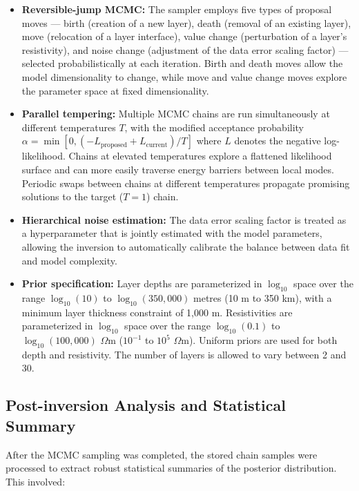 \begin{itemize}
    \item \textbf{Reversible-jump MCMC:} The sampler employs five types of proposal moves --- birth (creation of a new layer), death (removal of an existing layer), move (relocation of a layer interface), value change (perturbation of a layer's resistivity), and noise change (adjustment of the data error scaling factor) --- selected probabilistically at each iteration. Birth and death moves allow the model dimensionality to change, while move and value change moves explore the parameter space at fixed dimensionality.

    \item \textbf{Parallel tempering:} Multiple MCMC chains are run simultaneously at different temperatures $T$, with the modified acceptance probability $\alpha = \min\left[0, (-L_{\text{proposed}} + L_{\text{current}})/T\right]$ where $L$ denotes the negative log-likelihood. Chains at elevated temperatures explore a flattened likelihood surface and can more easily traverse energy barriers between local modes. Periodic swaps between chains at different temperatures propagate promising solutions to the target ($T = 1$) chain.

    \item \textbf{Hierarchical noise estimation:} The data error scaling factor is treated as a hyperparameter that is jointly estimated with the model parameters, allowing the inversion to automatically calibrate the balance between data fit and model complexity.

    \item \textbf{Prior specification:} Layer depths are parameterized in $\log_{10}$ space over the range $\log_{10}(10)$ to $\log_{10}(350{,}000)$ metres (10 m to 350 km), with a minimum layer thickness constraint of 1{,}000 m. Resistivities are parameterized in $\log_{10}$ space over the range $\log_{10}(0.1)$ to $\log_{10}(100{,}000)$ $\Omega$m ($10^{-1}$ to $10^{5}$ $\Omega$m). Uniform priors are used for both depth and resistivity. The number of layers is allowed to vary between 2 and 30.
\end{itemize}

\subsection*{Post-inversion Analysis and Statistical Summary}

After the MCMC sampling was completed, the stored chain samples were processed to extract robust statistical summaries of the posterior distribution. This involved:

